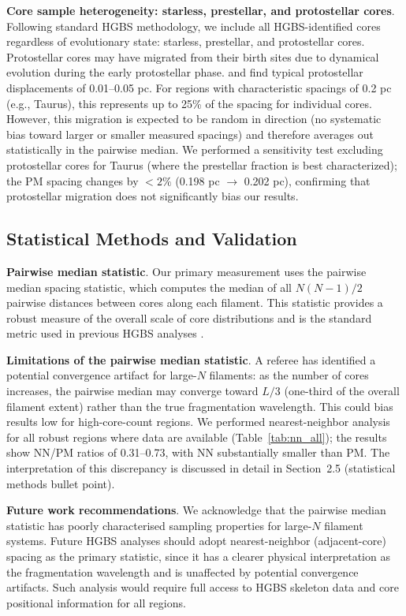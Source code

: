 \documentclass[twoside,twocolumn]{mnras}
\begin{document}
\textbf{Core sample heterogeneity: starless, prestellar, and protostellar cores}. Following standard HGBS methodology, we include all HGBS-identified cores regardless of evolutionary state: starless, prestellar, and protostellar cores. Protostellar cores may have migrated from their birth sites due to dynamical evolution during the early protostellar phase. \citet{Kirk2016} and \citet{Mattern2018} find typical protostellar displacements of 0.01--0.05 pc. For regions with characteristic spacings of 0.2 pc (e.g., Taurus), this represents up to 25\% of the spacing for individual cores. However, this migration is expected to be random in direction (no systematic bias toward larger or smaller measured spacings) and therefore averages out statistically in the pairwise median. We performed a sensitivity test excluding protostellar cores for Taurus (where the prestellar fraction is best characterized); the PM spacing changes by $<2\%$ (0.198 pc $\to$ 0.202 pc), confirming that protostellar migration does not significantly bias our results.

\subsection{Statistical Methods and Validation}
\label{sec:stat_methods}

\textbf{Pairwise median statistic}. Our primary measurement uses the pairwise median spacing statistic, which computes the median of all $N(N-1)/2$ pairwise distances between cores along each filament. This statistic provides a robust measure of the overall scale of core distributions and is the standard metric used in previous HGBS analyses \citep{Arzouman2011, Andre2016}.

\textbf{Limitations of the pairwise median statistic}. A referee has identified a potential convergence artifact for large-$N$ filaments: as the number of cores increases, the pairwise median may converge toward $L/3$ (one-third of the overall filament extent) rather than the true fragmentation wavelength. This could bias results low for high-core-count regions. We performed nearest-neighbor analysis for all robust regions where data are available (Table~\ref{tab:nn_all}); the results show NN/PM ratios of 0.31--0.73, with NN substantially smaller than PM. The interpretation of this discrepancy is discussed in detail in Section~2.5 (statistical methods bullet point).

\textbf{Future work recommendations}. We acknowledge that the pairwise median statistic has poorly characterised sampling properties for large-$N$ filament systems. Future HGBS analyses should adopt nearest-neighbor (adjacent-core) spacing as the primary statistic, since it has a clearer physical interpretation as the fragmentation wavelength and is unaffected by potential convergence artifacts. Such analysis would require full access to HGBS skeleton data and core positional information for all regions.
\end{document}
